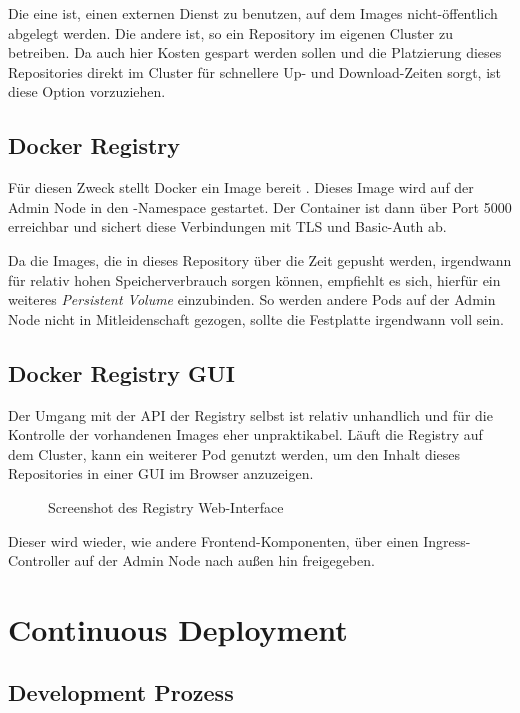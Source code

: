 Die eine ist, einen externen Dienst zu benutzen, auf dem Images nicht-öffentlich
abgelegt werden. Die andere ist, so ein Repository im eigenen
Cluster zu betreiben. Da auch hier Kosten gespart werden sollen und die
Platzierung dieses Repositories direkt im Cluster für schnellere
Up- und Download-Zeiten sorgt, ist diese Option vorzuziehen.

\subsection{Docker Registry}

Für diesen Zweck stellt Docker ein Image bereit \cite{reg}.
Dieses Image wird auf der Admin Node in den -Namespace gestartet.
Der Container ist dann über Port 5000 erreichbar und sichert diese Verbindungen mit
TLS und Basic-Auth ab.

Da die Images, die in dieses Repository über die Zeit gepusht werden,
irgendwann für relativ hohen Speicherverbrauch sorgen können,
empfiehlt es sich, hierfür ein weiteres \emph{Persistent Volume} einzubinden. So
werden andere Pods auf der Admin Node nicht in Mitleidenschaft gezogen, sollte
die Festplatte irgendwann voll sein.

\subsection{Docker Registry GUI}

Der Umgang mit der API der Registry selbst ist relativ unhandlich und für
die Kontrolle der vorhandenen Images eher unpraktikabel.
Läuft die Registry auf dem Cluster, kann ein weiterer Pod genutzt werden, um
den Inhalt dieses Repositories in einer GUI im Browser anzuzeigen.

\begin{figure}[H]
\centering
{}
\caption{Screenshot des Registry Web-Interface}
\end{figure}

Dieser wird wieder, wie andere Frontend-Komponenten, über einen
Ingress-Controller auf der Admin Node nach außen hin freigegeben.

\section{Continuous Deployment}

\subsection{Development Prozess}


